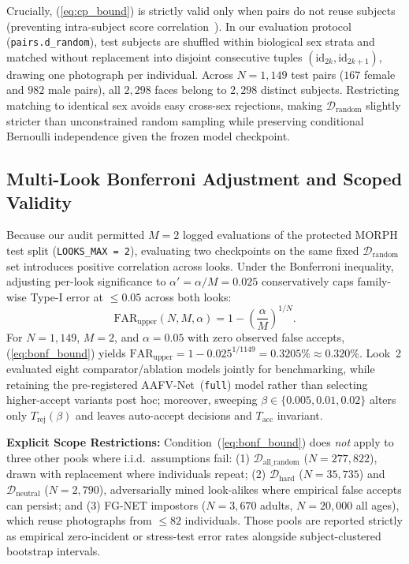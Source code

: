 \documentclass[journal]{IEEEtran}
\newcommand{\sys}{AAFV-Net}
\begin{document}
Crucially, (\ref{eq:cp_bound}) is strictly valid only when pairs do not reuse subjects (preventing intra-subject score correlation~\cite{bolle2004subsets}). In our evaluation protocol (\texttt{pairs.d\_random}), test subjects are shuffled within biological sex strata and matched without replacement into disjoint consecutive tuples $(\text{id}_{2k}, \text{id}_{2k+1})$, drawing one photograph per individual. Across $N = 1{,}149$ test pairs ($167$ female and $982$ male pairs), all $2{,}298$ faces belong to $2{,}298$ distinct subjects. Restricting matching to identical sex avoids easy cross-sex rejections, making $\mathcal{D}_{\text{random}}$ slightly stricter than unconstrained random sampling while preserving conditional Bernoulli independence given the frozen model checkpoint.

\subsection{Multi-Look Bonferroni Adjustment and Scoped Validity}
Because our audit permitted $M = 2$ logged evaluations of the protected MORPH test split (\texttt{LOOKS\_MAX = 2}), evaluating two checkpoints on the same fixed $\mathcal{D}_{\text{random}}$ set introduces positive correlation across looks. Under the Bonferroni inequality, adjusting per-look significance to $\alpha' = \alpha / M = 0.025$ conservatively caps family-wise Type-I error at $\le 0.05$ across both looks:
\begin{equation}
\label{eq:bonf_bound}
\text{FAR}_{\text{upper}}(N, M, \alpha) = 1 - \left(\frac{\alpha}{M}\right)^{1/N}.
\end{equation}
For $N = 1{,}149$, $M = 2$, and $\alpha = 0.05$ with zero observed false accepts, (\ref{eq:bonf_bound}) yields $\text{FAR}_{\text{upper}} = 1 - 0.025^{1/1149} = 0.3205\% \approx 0.320\%$. Look~2 evaluated eight comparator/ablation models jointly for benchmarking, while retaining the pre-registered \sys\ (\texttt{full}) model rather than selecting higher-accept variants post hoc; moreover, sweeping $\beta \in \{0.005, 0.01, 0.02\}$ alters only $T_{\text{rej}}(\beta)$ and leaves auto-accept decisions and $T_{\text{acc}}$ invariant.

\textbf{Explicit Scope Restrictions:} Condition~(\ref{eq:bonf_bound}) does \emph{not} apply to three other pools where i.i.d.\ assumptions fail: (1) $\mathcal{D}_{\text{all\_random}}$ ($N=277{,}822$), drawn with replacement where individuals repeat; (2) $\mathcal{D}_{\text{hard}}$ ($N=35{,}735$) and $\mathcal{D}_{\text{neutral}}$ ($N=2{,}790$), adversarially mined look-alikes where empirical false accepts can persist; and (3) FG-NET impostors ($N=3{,}670$ adults, $N=20{,}000$ all ages), which reuse photographs from $\le 82$ individuals. Those pools are reported strictly as empirical zero-incident or stress-test error rates alongside subject-clustered bootstrap intervals.
\end{document}
